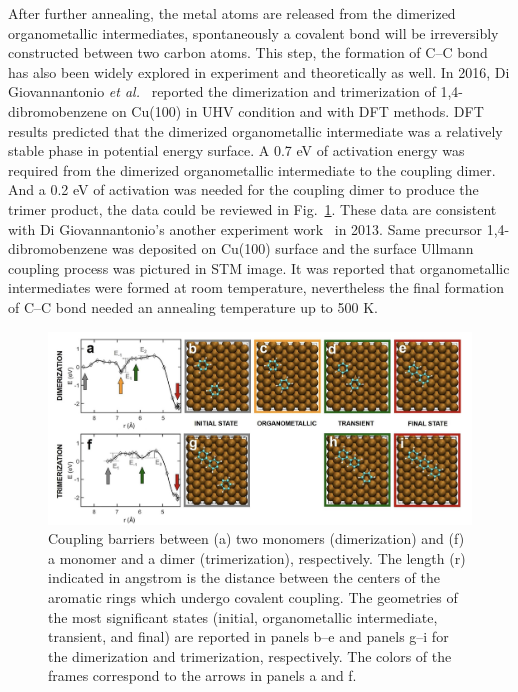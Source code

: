 \documentclass[%
 reprint,
 amsmath,amssymb,
 aps,
prb,
]{revtex4-2}
\begin{document}
After further annealing, the metal atoms are released from the dimerized organometallic intermediates, spontaneously a covalent bond will be irreversibly constructed between two carbon atoms. This step, the formation of C--C bond has also been widely explored in experiment and theoretically as well. In 2016, Di Giovannantonio \textit{et al.}~\cite{jacs2016} reported the dimerization and trimerization of 1,4-dibromobenzene on Cu(100) in UHV condition and with DFT methods. DFT results predicted that the dimerized organometallic intermediate was a relatively stable phase in potential energy surface. A 0.7 eV of activation energy was required from the dimerized organometallic intermediate to the coupling dimer. And a 0.2 eV of activation was needed for the coupling dimer to produce the trimer product, the data could be reviewed in Fig.~\ref{fig:dimer}. These data are consistent with Di Giovannantonio's another experiment work~\cite{acsnano2013} in 2013. Same precursor 1,4-dibromobenzene was deposited on Cu(100) surface and the surface Ullmann coupling process was pictured in STM image. It was reported that organometallic intermediates were formed at room temperature, nevertheless the final formation of C--C bond needed an annealing temperature up to 500 K.
%
\begin{figure}[ht]
\centering
\includegraphics[width=1.0\textwidth]{Fig/Dimer_trimer.png}
\caption{Coupling barriers between (a) two monomers (dimerization) and (f) a monomer and a dimer (trimerization), respectively. The length (r) indicated in angstrom is the distance between the centers of the aromatic rings which undergo covalent coupling. The geometries of the most significant states (initial, organometallic intermediate, transient, and final) are reported in panels b--e and panels g--i for the dimerization and trimerization, respectively. The colors of the frames correspond to the arrows in panels a and f.}
\label{fig:dimer}
\end{figure}
%
\end{document}
